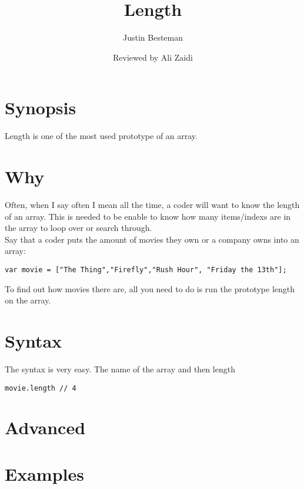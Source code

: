 \documentclass[12pt, letterpaper]{article}
\title{Length}
\author{Justin Besteman}
\date{Reviewed by Ali Zaidi}
\begin{document}
\maketitle


\section*{Synopsis}

Length is one of the most used prototype of an array. 

\section*{Why}

Often, when I say often I mean all the time, a coder will want to know the length of an array. This is needed to be enable to 
know how many items/indexs are in the array to loop over or search through. \\
Say that a coder puts the amount of movies they own or a company owns into an array:
\begin{lstlisting}
var movie = ["The Thing","Firefly","Rush Hour", "Friday the 13th"];
\end{lstlisting}
To find out how movies there are, all you need to do is run the prototype length on the array.
\section*{Syntax}
The syntax is very easy. The name of the array and then length
\begin{lstlisting}
movie.length // 4
\end{lstlisting}
\section*{Advanced}

\section*{Examples}
\end{document}
